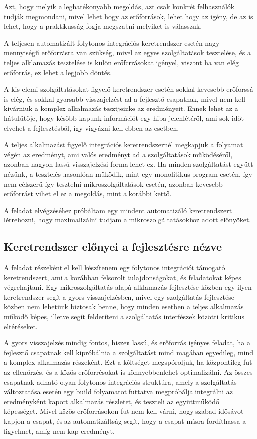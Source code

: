 \documentclass[11pt,magyar,a4paper,twoside,]{report}
\begin{document}
Azt, hogy melyik a leghatékonyabb megoldás, azt csak konkrét
felhasználók tudják megmondani, mivel lehet hogy az erőforrások, lehet
hogy az igény, de az is lehet, hogy a praktikusság fogja megszabni
melyiket is válasszuk.

A teljesen automatizált folytonos integrációs keretrendszer esetén nagy
mennyiségű erőforrásra van szükség, mivel az egyes szolgáltatások
tesztelése, és a teljes alklamazás tesztelése is külön erőforrásokat
igényel, viszont ha van elég erőforrás, ez lehet a legjobb döntés.

A kis elemi szolgáltatásokat figyelő keretrendszer esetén sokkal
kevesebb erőforssá is elég, és sokkal gyorsabb visszajelzést ad a
fejlesztő csapatnak, mivel nem kell kivárniuk a komplex alkalmazás
tesztjeinke az eredményeit. Ennek lehet az a hátulütője, hogy később
kapunk információt egy hiba jelenlétéről, ami sok időt elvehet a
fejlesztésből, így vigyázni kell ebben az esetben.

A teljes alkalmazást figyelő integrációs keretrendszernél megkapjuk a
folyamat végén az eredményt, ami valós eredményt ad a szolgáltatások
működéséről, azonban nagyon lassú visszajelzési forma lehet ez. Ha
minden szolgáltatást együtt nézünk, a tesztelés hasonlóan működik, mint
egy monolitikus program esetén, így nem célszerű így tesztelni
mikroszolgáltatások esetén, azonban kevesebb erőforrást vihet el ez a
megoldás, mint a korábbi kettő.

A feladat elvégzéséhez próbáltam egy mindent automatizáló keretrendszert
létrehozni, hogy maximalizálni tudjam a mikroszolgáltatásokhoz adott
előnyöket.

\subsection{Keretrendszer előnyei a fejlesztésre
nézve}\label{keretrendszer-elux151nyei-a-fejlesztuxe9sre-nuxe9zve}

A feladat részeként el kell készítenem egy folytonos integrációt
támogató keretrendszert, ami a korábban felsorolt tulajdonságokat, és
feladatokat képes végrehajtani. Egy mikroszolgáltatás alapú alklamazás
fejlesztése közben egy ilyen keretrendszer segít a gyors
visszajelzésben, mivel egy szolgáltatás fejlesztése közben nem lehetünk
biztosak benne, hogy minden esetben a teljes alkalmazás működő képes,
illetve segít felderíteni a szolgáltatás interfészek közötti kritikus
eltéréseket.

A gyors visszajelzés mindig fontos, hiszen lassú, és erőforrás igényes
feladat, ha a fejlesztő csapatnak kell kipróbálnia a szolgáltatást mind
magában egyedileg, mind a komplex alkalmazás részeként. Ezt a költséget
megspóroljuk, ha központileg fut az ellenőrzés, és a közös erőforrésokat
is könnyebbenlehet optimalizálni. Az összes csapatnak adható olyan
folytonos integrációs struktúra, amely a szolgáltatás változtatása
esetén egy build folyamatot futtatva megpróbálja integrálni az
eredményként kapott alkalmazás részletet, és teszteli az együttműködő
képességet. Mivel közös erőforrásokon fut nem kell várni, hogy szabad
idősávot kapjon a csapat, és az automatizáltság segít, hogy a csapat
másra fordíthassa a figyelmet, amíg nem kap eredményt.
\end{document}
